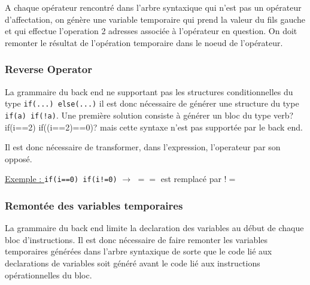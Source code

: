 A chaque opérateur rencontré dans l'arbre syntaxique qui n'est pas un opérateur d'affectation, on génère une variable temporaire qui prend la valeur du fils gauche et qui effectue l'operation 2 adresses associée à l'opérateur en question. On doit remonter le résultat de l'opération temporaire dans le noeud de l'opérateur.

\begin{center}
\end{center}

\subsubsection{Reverse Operator}

La grammaire du back end ne supportant pas les structures conditionnelles du type \verb?if(...) else(...)? il est donc nécessaire de générer une structure du type \verb?if(a) if(!a)?. Une première solution consiste à générer un bloc du type verb?if(i==2) if((i==2)==0)? mais cette syntaxe n'est pas supportée par le back end.

Il est donc nécessaire de transformer, dans l'expression, l'operateur par son opposé.

\underline{Exemple : } \verb?if(i==0) if(i!=0)? $\longrightarrow$ $==$ est remplacé par $!=$

\subsubsection{Remontée des variables temporaires}

La grammaire du back end limite la declaration des variables au début de chaque bloc d'instructions. Il est donc nécessaire de faire remonter les variables temporaires générées dans l'arbre syntaxique de sorte que le code lié aux declarations de variables soit généré avant le code lié aux instructions opérationnelles du bloc.

